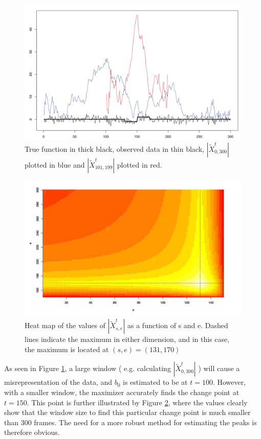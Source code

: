 \documentclass[%
 reprint,
 amsmath,amssymb,
 aps,
]{revtex4-1}
\begin{document}
\begin{figure}
  \includegraphics[width=\linewidth]{bsisBS.png}
  \caption{True function in thick black, observed data in thin black, \( |\tilde{X}^{t}_{0,300}| \) plotted in blue and  \( |\tilde{X}^{t}_{101,199}| \) plotted in red.}
  \label{fig_bs}
\end{figure}
\begin{figure}
  \includegraphics[width=\linewidth]{heatmap.png}
  \caption{Heat map of the values of  \( |\tilde{X}^{t}_{s,e}| \) as a function of s and e.
  Dashed lines indicate the maximum in either dimension, and in this case, the maximum is located at $(s,e)=(131,170)$
  }
  \label{heatmap}
\end{figure}

As seen in Figure \ref{fig_bs}, a large window ( e.g. calculating \( |\tilde{X}^{t}_{0,300}| \) ) will cause a misrepresentation of the data, and $b_0$ is estimated to be at $t=100$.
However, with a smaller window, the maximizer accurately finds the change point at $t=150$.
This point is further illustrated by Figure \ref{heatmap}, where the values clearly show that the window size to find this particular change point is much smaller than 300 frames.
The need for a more robust method for estimating the peaks is therefore obvious.
\end{document}
